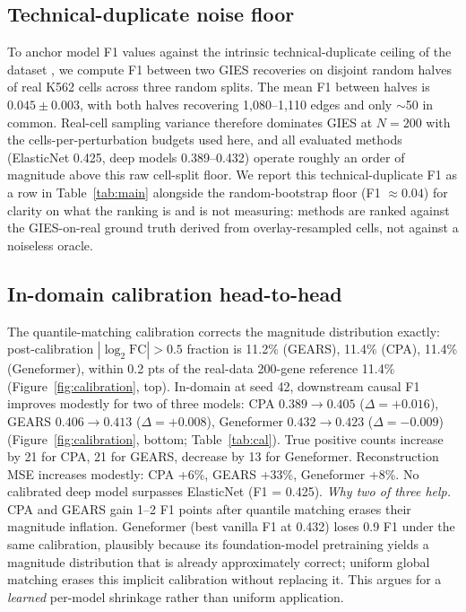 \documentclass{article}
\theoremstyle{plain}
\theoremstyle{definition}
\theoremstyle{remark}
\begin{document}
\subsection{Technical-duplicate noise floor}
\label{app:noisefloor}
To anchor model F1 values against the intrinsic technical-duplicate ceiling of the dataset \citep{mejia2025diversity,miller2025calibrated}, we compute F1 between two GIES recoveries on disjoint random halves of real K562 cells across three random splits. The mean F1 between halves is $0.045 \pm 0.003$, with both halves recovering 1{,}080--1{,}110 edges and only $\sim$50 in common. Real-cell sampling variance therefore dominates GIES at $N{=}200$ with the cells-per-perturbation budgets used here, and all evaluated methods (ElasticNet 0.425, deep models 0.389--0.432) operate roughly an order of magnitude above this raw cell-split floor. We report this technical-duplicate F1 as a row in Table~\ref{tab:main} alongside the random-bootstrap floor (F1 $\approx 0.04$) for clarity on what the ranking is and is not measuring: methods are ranked against the GIES-on-real ground truth derived from overlay-resampled cells, not against a noiseless oracle.

\subsection{In-domain calibration head-to-head}
\label{app:calib-indomain}
The quantile-matching calibration corrects the magnitude distribution exactly: post-calibration $|\log_2 \mathrm{FC}|>0.5$ fraction is 11.2\% (GEARS), 11.4\% (CPA), 11.4\% (Geneformer), within 0.2 pts of the real-data 200-gene reference 11.4\% (Figure~\ref{fig:calibration}, top). In-domain at seed 42, downstream causal F1 improves modestly for two of three models: CPA $0.389 \to 0.405$ ($\Delta = +0.016$), GEARS $0.406 \to 0.413$ ($\Delta = +0.008$), Geneformer $0.432 \to 0.423$ ($\Delta = -0.009$) (Figure~\ref{fig:calibration}, bottom; Table~\ref{tab:cal}). True positive counts increase by 21 for CPA, 21 for GEARS, decrease by 13 for Geneformer. Reconstruction MSE increases modestly: CPA +6\%, GEARS +33\%, Geneformer +8\%. No calibrated deep model surpasses ElasticNet (F1 = 0.425). \emph{Why two of three help.} CPA and GEARS gain 1--2 F1 points after quantile matching erases their magnitude inflation. Geneformer (best vanilla F1 at 0.432) loses 0.9 F1 under the same calibration, plausibly because its foundation-model pretraining yields a magnitude distribution that is already approximately correct; uniform global matching erases this implicit calibration without replacing it. This argues for a \emph{learned} per-model shrinkage rather than uniform application.
\end{document}
